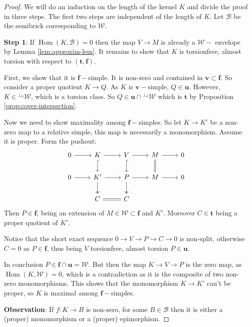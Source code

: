 \documentclass[10pt,a4paper]{amsart}
\newcommand{\B}{\mathcal B}
\newcommand{\Hom}{\operatorname{Hom}}
\newcommand{\tpair}[2]{(\mathbf{#1}, \mathbf{#2})  }
\begin{document}
\begin{proof}
We will do an induction on the length of the kernel \( K \) and divide the proof in three steps. The first two steps are independent of the length of \( K \). Let \( \B \) be the semibrick corresponding to \( \mathcal{W} \).

\noindent\textbf{Step 1}: If \( \Hom(K, \B) = 0 \) then the map \( V \to M \) is already a \( \mathcal{W}-\) envelope by Lemma \ref{lem:approxim-lem}. It remains to show that \( K \) is torsionfree, almost torsion with respect to \( \tpair{t}{f} \). 

First, we show that it is \( \mathbf{f}-\)simple. It is non-zero and contained in $ \mathbf{v} \subset \mathbf{f} $. So consider a proper quotient \( K \to Q \). As \( K \) is \( \mathbf{v}-\)simple, \( Q \in \mathbf{u} \). However, \( K \in {}^{\perp_0} \mathcal{W} \), which is a torsion class. So \( Q \in \mathbf{u} \cap {}^{\perp_0} \mathcal{W} \) which is  \( \mathbf{t} \) by Proposition \ref{prop:cover-intersection}.

Now we need to show maximality among \( \mathbf{f}-\)simples. So let $ K \to K' $ be a non-zero map to a relative simple, this map is necessarily a monomorphism. Assume it is proper. Form the pushout:
\[
\begin{tikzcd}
0 \ar[r] & K \ar[r] \ar[d, hook] & V \ar[r] \ar[d, hook] & M \ar[r] \ar[d, equals] & 0 \\
0 \ar[r] & K' \ar[d, two heads] \ar[r] & P \ar[d, two heads] \ar[r] & M \ar[r] & 0 \\
& C \ar[r, equals] & C
\end{tikzcd}
\]
Then $ P \in \mathbf{f} $, being an extension of $ M \in \mathcal{W} \subset \mathbf{f} $ and $ K' $. Moreover \( C \in \mathbf{t} \) being a proper quotient of \( K' \).

 Notice that the short exact sequence \( 0 \to V \to P \to C \to 0 \) is non-split, otherwise \( C = 0 \) as \( P \in \mathbf{f} \), thus being \( V \) torsionfree, almost torsion \( P \in \mathbf{u} \).

In conclusion \( P \in \mathbf{f} \cap \mathbf{u} = \mathcal{W} \). But then the map \( K \to  V \to P \) is the zero map, as \( \Hom(K, \mathcal{W}) = 0 \), which is a contradiction as it is the composite of two non-zero monomorphisms. This shows that the monomorphism \( K \to K' \) can't be proper, so \( K \) is maximal among \( \mathbf{f}-\)simples.

\noindent \textbf{Observation}: If \( f : K \to B \) is non-zero, for some \( B \in \mathcal{B} \) then it is either a (proper) monomorphism or a (proper) epimorphism. 


\end{proof}
\end{document}
